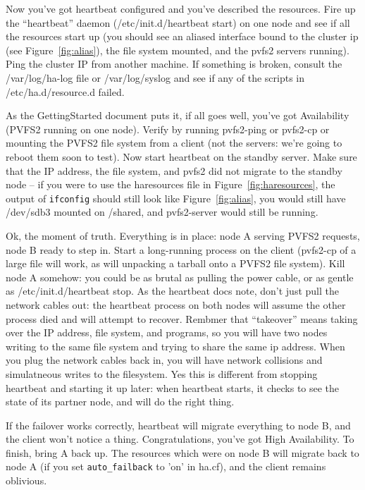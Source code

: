 \documentclass[11pt]{article}
\begin{document}
Now you've got heartbeat configured and you've described the resources.
Fire up the ``heartbeat'' daemon (/etc/init.d/heartbeat start) on one
node and see if all the resources start up (you should see an aliased
interface bound to the cluster ip (see Figure~\ref{fig:alias}), the file system mounted, and the
pvfs2 servers running).
Ping the cluster IP from another machine.  If something is broken,
consult the /var/log/ha-log file or /var/log/syslog and see if any of
the scripts in /etc/ha.d/resource.d failed.

As the GettingStarted document puts it, if all goes well, you've got
Availability (PVFS2 running on one node).  Verify by running pvfs2-ping
or pvfs2-cp or mounting the PVFS2 file system from a client (not the
servers: we're going to reboot them soon to test).  Now start heartbeat
on the standby server.  Make sure that the IP address, the file system,
and pvfs2 did not migrate to the standby node --  if you were to use the
haresources file in Figure~\ref{fig:haresources}, the output of
\texttt{ifconfig} should still look like Figure~\ref{fig:alias}, you
would still have /dev/sdb3 mounted on /shared, and pvfs2-server would
still be running. 

Ok, the moment of truth.  Everything is in place: node A serving PVFS2
requests, node B ready to step in.  Start a long-running process on the
client (pvfs2-cp of a large file will work, as will unpacking a tarball
onto a PVFS2 file system).  Kill node A somehow:  you could be as brutal
as pulling the power cable, or as gentle as /etc/init.d/heartbeat stop.
As the heartbeat docs note, don't just pull the network cables out: the
heartbeat process on both nodes will assume the other process died and
will attempt to recover.  Rembmer that ``takeover'' means taking over
the IP address, file system, and programs, so you will have two nodes
writing to the same file system and trying to share the same ip address.
When you plug the network cables back in, you will have network
collisions and simulatneous writes to the filesystem.  Yes this is
different from stopping heartbeat and starting it up later: when
heartbeat starts, it checks to see the state of its partner node, and
will do the right thing. 

If the failover works correctly, heartbeat will migrate everything to
node B, and the client won't notice a thing.   Congratulations, you've
got High Availability.  To finish, bring A back up.  The resources which
were on node B will migrate back to node A (if you set
\texttt{auto\_failback} to 'on' in ha.cf), and the client remains
oblivious.
\end{document}
